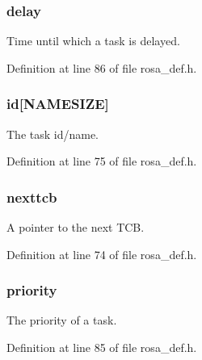 \subsubsection[{delay}]{\setlength{\rightskip}{0pt plus 5cm}delay}\label{structtcb__record__t_a5b1f6f1eaa44ff5c4f80c23687f4f324}
Time until which a task is delayed. 

Definition at line 86 of file rosa\+\_\+def.\+h.

\hypertarget{structtcb__record__t_aa25efaaaecf8c7c4d679dbc94aec3031}{}
\subsubsection[{id}]{\setlength{\rightskip}{0pt plus 5cm}id\mbox{[}N\+A\+M\+E\+S\+I\+Z\+E\mbox{]}}\label{structtcb__record__t_aa25efaaaecf8c7c4d679dbc94aec3031}
The task id/name. 

Definition at line 75 of file rosa\+\_\+def.\+h.

\hypertarget{structtcb__record__t_abe5f58939c000c4f6b06c911bead561c}{}
\subsubsection[{nexttcb}]{\setlength{\rightskip}{0pt plus 5cm}nexttcb}\label{structtcb__record__t_abe5f58939c000c4f6b06c911bead561c}
A pointer to the next T\+C\+B. 

Definition at line 74 of file rosa\+\_\+def.\+h.

\hypertarget{structtcb__record__t_a6a5183df4c54c3e28dc8dc704f2487d5}{}
\subsubsection[{priority}]{\setlength{\rightskip}{0pt plus 5cm}priority}\label{structtcb__record__t_a6a5183df4c54c3e28dc8dc704f2487d5}
The priority of a task. 

Definition at line 85 of file rosa\+\_\+def.\+h.

\hypertarget{structtcb__record__t_a3a7c64427bddbb6ef8ac755f2782baf7}{}
